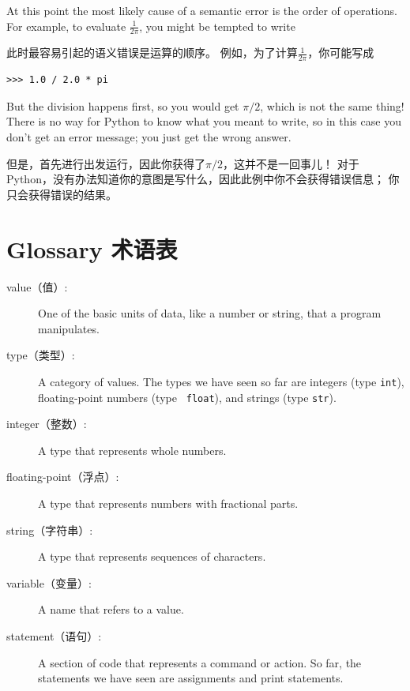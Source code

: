\documentclass[10pt]{book}
\begin{document}
\begin{CJK}{UTF8}{gbsn}
At this point the most likely cause of a semantic error is
the order of operations.  For example, to evaluate
 $\frac{1}{2 \pi}$,
you might be tempted to write

此时最容易引起的语义错误是运算的顺序。
例如，为了计算$\frac{1}{2 \pi}$，你可能写成

\begin{verbatim}
>>> 1.0 / 2.0 * pi
\end{verbatim}
%
But the division happens first, so you would get $\pi / 2$, which
is not the same thing!  There is no way for Python
to know what you meant to write, so in this case you don't
get an error message; you just get the wrong answer.

但是，首先进行出发运行，因此你获得了$\pi / 2$，这并不是一回事儿！
对于Python，没有办法知道你的意图是写什么，因此此例中你不会获得错误信息；
你只会获得错误的结果。

\section{Glossary 术语表}

\begin{description}

\item[value（值）:]  One of the basic units of data, like a number or string, 
that a program manipulates.

\item[type（类型）:] A category of values.  The types we have seen so far
are integers (type {\tt int}), floating-point numbers (type {\tt
float}), and strings (type {\tt str}).

\item[integer（整数）:] A type that represents whole numbers.

\item[floating-point（浮点）:] A type that represents numbers with fractional
parts.

\item[string（字符串）:] A type that represents sequences of characters.

\item[variable（变量）:]  A name that refers to a value.

\item[statement（语句）:]  A section of code that represents a command or action.  So
far, the statements we have seen are assignments and print statements.


\end{description}
\end{CJK}
\end{document}
